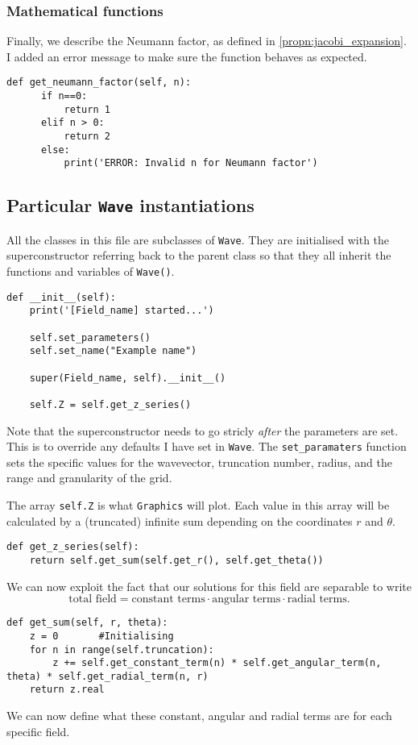\subsubsection{Mathematical functions}
%
Finally, we describe the Neumann factor, as defined in \ref{propn:jacobi_expansion}. I added an error message to make sure the function behaves as expected.
  \begin{lstlisting}
def get_neumann_factor(self, n):
      if n==0:
          return 1
      elif n > 0:
          return 2
      else:
          print('ERROR: Invalid n for Neumann factor')\end{lstlisting}
%
\subsection{Particular \texttt{Wave} instantiations}
%
All the classes in this file are subclasses of \verb!Wave!. They are initialised with the superconstructor referring back to the parent class so that they all inherit the functions and variables of \verb!Wave()!.
%
  \begin{lstlisting}
def __init__(self):
    print('[Field_name] started...')

    self.set_parameters()
    self.set_name("Example name")

    super(Field_name, self).__init__()

    self.Z = self.get_z_series()\end{lstlisting}\par
%
Note that the superconstructor needs to go stricly \textit{after} the parameters are set. This is to override any defaults I have set in \verb!Wave!. The \verb!set_paramaters! function sets the specific values for the wavevector, truncation number, radius, and the range and granularity of the grid. \par
%
The array \verb!self.Z! is what \verb!Graphics! will plot. Each value in this array will be calculated by a (truncated) infinite sum depending on the coordinates $r$ and $\theta$.
%
  \begin{lstlisting}
def get_z_series(self):
    return self.get_sum(self.get_r(), self.get_theta()) \end{lstlisting}
%
We can now exploit the fact that our solutions for this field are separable to write
  \begin{equation}
    \text{total field} = \text{constant terms} \cdot \text{angular terms} \cdot \text{radial terms}.
  \end{equation}\par
%
  \begin{lstlisting}
def get_sum(self, r, theta):
    z = 0       #Initialising
    for n in range(self.truncation):
        z += self.get_constant_term(n) * self.get_angular_term(n, theta) * self.get_radial_term(n, r)
    return z.real   \end{lstlisting}\par
%
We can now define what these constant, angular and radial terms are for each specific field.
%
